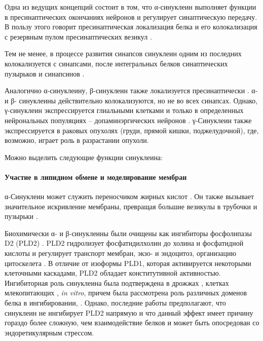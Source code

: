 Одна из ведущих концепций состоит в том, что  α-синуклеин выполняет функции в пресинаптических окончаниях нейронов и регулирует синаптическую передачу. В пользу этого говорит пресинаптическая локализация белка и его колокализация с резервным пулом пресинаптических везикул \cite{lee_-synuclein_2008}.

Тем не менее, в процессе развития синапсов синуклеин одним из последних колокализуется с синапсами, после интегральных белков синаптических пузырьков и синапсинов \cite{withers_delayed_1997}.

Аналогично α-синуклеину, β-синуклеин также локализуется пресинаптически \cite{jakes_identification_1994}. α- и  β- синуклеины действительно колокализуются, но не во всех синапсах. Однако, γ-синуклеин экспрессируется глиальными клетками и только в определенных нейрональных популяциях -- допаминэргических нейронов \cite{galvin_differential_2001}. γ-Синуклеин также экспрессируется в раковых опухолях (груди, прямой кишки, поджелудочной), где, возможно, играет роль в разрастании опухоли. 

 

Можно выделить следующие функции синуклеина:
\paragraph{Участие в липидном обмене и моделирование мембран} α-Синуклеин может служить переносчиком жирных кислот \cite{sharon_-synuclein_2001}.
Он также вызывает значительное искривление мембраны, превращая большие везикулы в трубочки и пузырьки  \cite{westphal_monomeric_2013} .
 
Биохимически α- и β-синуклеины были очищены как ингибиторы фосфолипазы D2 (PLD2) \cite{jenco_regulation_1998}. PLD2 гидролизует фосфатидилхолин до холина и фосфатидной кислоты и регулирует транспорт мембран, экзо- и эндоцитоз, организацию цитоскелета \cite{colley_phospholipase_1997}. В отличие от изоформы PLD1, которая активируется некоторыми клеточными каскадами, PLD2 обладает конститутивной активностью. Ингибиторная роль синуклеина была подтверждена в дрожжах \cite{outeiro_yeast_2003}, клетках млекопитающих \cite{ahn_-synuclein_2002}, \textit{in vitro}, причем была рассмотрена роль различных доменов белка в ингибировании, \cite{payton_structural_2004}. Однако, последние работы предполагают, что синуклеин не ингибирует PLD2 напрямую \cite{rappley_evidence_2009} и что данный эффект имеет причину гораздо более сложную, чем взаимодействие белков и может быть опосредован со эндоретикулярным стрессом.




